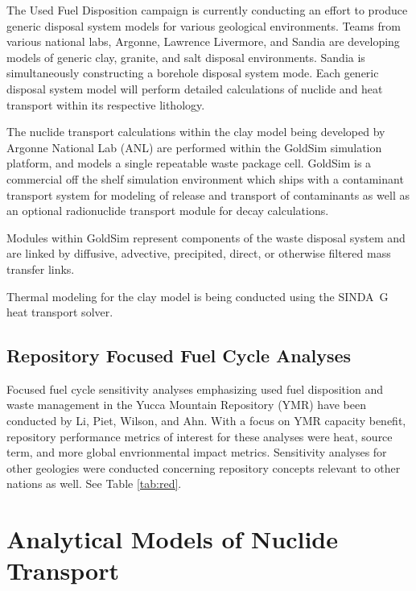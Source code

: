 The Used Fuel Disposition campaign is currently conducting an effort to produce
generic disposal system models for various geological environments. Teams from
various national labs, Argonne, Lawrence Livermore, and Sandia are developing
models of generic clay, granite,   and salt disposal environments. Sandia is
simultaneously constructing  a borehole disposal system mode. Each generic
disposal system model will perform detailed calculations of nuclide  and heat
transport within its respective lithology. 

The nuclide transport calculations within the  clay model being developed by
Argonne National Lab (ANL) are performed within the GoldSim simulation
platform, and models a single repeatable waste package cell. GoldSim is a
commercial off the shelf simulation environment which ships with a contaminant
transport system for modeling of release and transport of contaminants as well
as an optional radionuclide transport module for decay calculations.

Modules within GoldSim represent components of the waste disposal system and
are linked by diffusive, advective, precipited, direct, or  otherwise filtered
mass transfer links.

Thermal modeling for the clay model is being conducted using the SINDA\ G heat
transport solver.  

\subsection{Repository Focused Fuel Cycle Analyses}

Focused fuel cycle sensitivity analyses emphasizing used fuel disposition and
waste management in the Yucca Mountain Repository (YMR) have been conducted by
Li, Piet, Wilson, and Ahn. With a focus on YMR capacity benefit, repository
performance metrics of interest for these analyses were heat, source term, and
more global envrionmental impact metrics.  Sensitivity analyses for other
geologies were conducted concerning repository concepts relevant to other
nations as well. See Table \ref{tab:red}.

\section{Analytical Models of Nuclide Transport} \label{sec:analytical_nuc}


